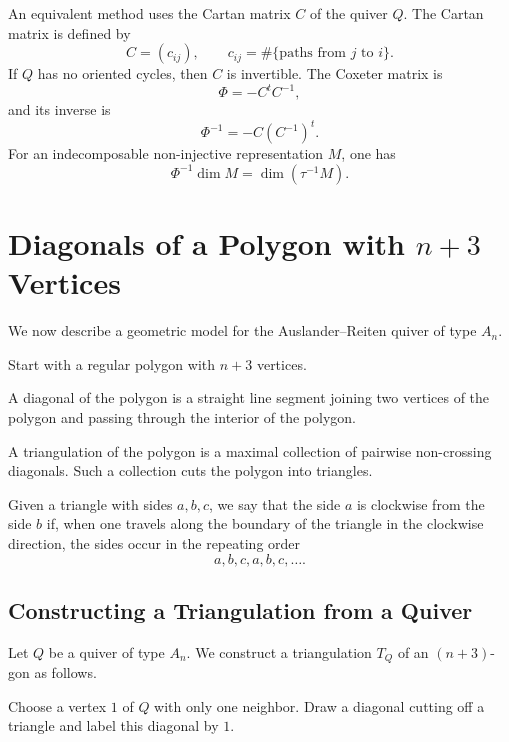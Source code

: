 \documentclass[11pt, a4paper]{report}
\begin{document}
\begin{remark}
    An equivalent method uses the Cartan matrix \(C\) of the quiver \(Q\).
    The Cartan matrix is defined by
    \[
        C=(c_{ij}),
        \qquad
        c_{ij}=\#\{\text{paths from }j\text{ to }i\}.
    \]
    If \(Q\) has no oriented cycles, then \(C\) is invertible. The Coxeter matrix
    is
    \[
        \Phi=-C^tC^{-1},
    \]
    and its inverse is
    \[
        \Phi^{-1}=-C(C^{-1})^t.
    \]
    For an indecomposable non-injective representation \(M\), one has
    \[
        \Phi^{-1}\dim M=\dim(\tau^{-1}M).
    \]
\end{remark}

\section{Diagonals of a Polygon with \texorpdfstring{\(n+3\)}{n+3} Vertices}

We now describe a geometric model for the Auslander--Reiten quiver of type
\(A_n\).

Start with a regular polygon with \(n+3\) vertices.

\begin{definition}[Diagonal]
    A diagonal of the polygon is a straight line segment joining two vertices of
    the polygon and passing through the interior of the polygon.
\end{definition}

\begin{definition}[Triangulation]
    A triangulation of the polygon is a maximal collection of pairwise non-crossing
    diagonals. Such a collection cuts the polygon into triangles.
\end{definition}

Given a triangle with sides \(a,b,c\), we say that the side \(a\) is clockwise from
the side \(b\) if, when one travels along the boundary of the triangle in the
clockwise direction, the sides occur in the repeating order
\[
    a,b,c,a,b,c,\dots.
\]

\subsection{Constructing a Triangulation from a Quiver}

Let \(Q\) be a quiver of type \(A_n\). We construct a triangulation \(T_Q\) of an
\((n+3)\)-gon as follows.

Choose a vertex \(1\) of \(Q\) with only one neighbor. Draw a diagonal cutting
off a triangle and label this diagonal by \(1\).
\end{document}

